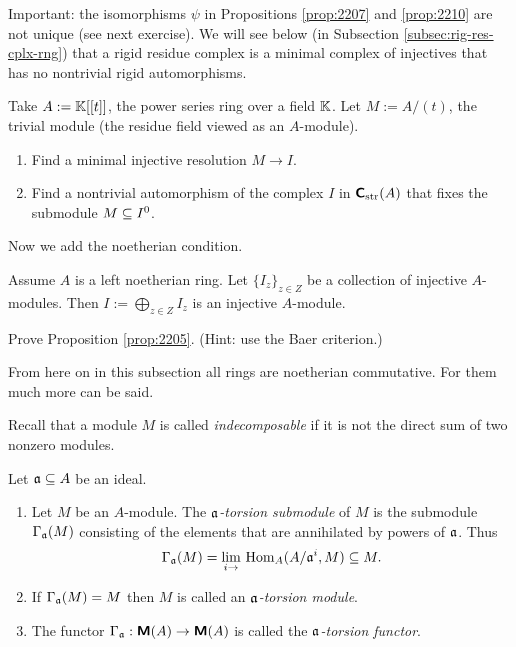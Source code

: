 \begin{rem} \label{rem:2210}
Important: the isomorphisms $\psi$ in Propositions \ref{prop:2207} and 
\ref{prop:2210} are not unique (see next exercise). We will see below (in 
Subsection \ref{subsec:rig-res-cplx-rng}) 
that a rigid residue complex is a minimal complex of injectives that has no 
nontrivial rigid automorphisms. 
\end{rem}

\begin{exer} \label{exer:2210}
Take $A := \mathbb{K}[[t]]$, the power series ring over a field $\mathbb{K}$. 
Let $M := A / (t)$, the trivial module (the residue field viewed as an 
$A$-module). 
\begin{enumerate}
\item Find a minimal injective resolution $M \to  I$. 

\item Find a nontrivial automorphism of the complex $I$ in 
$\boldsymbol{\mathsf{C}}_{\mathrm{str}}(A)$ that fixes the submodule $M \subseteq I^0$. 
\end{enumerate}
\end{exer}

Now we add the noetherian condition. 

\begin{prop} \label{prop:2205}
Assume $A$ is a left noetherian ring. 
Let $\{ I_z \}_{z \in Z}$ be a collection of injective $A$-modules. Then 
$I := \bigoplus_{z \in Z} I_z$ is an injective $A$-module. 
\end{prop}

\begin{exer} \label{exer:2205}
Prove Proposition \ref{prop:2205}. (Hint: use the Baer criterion.)
\end{exer}

From here on in this subsection all rings are noetherian commutative. For 
them much more can be said.

Recall that a module $M$ is called {\em indecomposable} if it is not the 
direct sum of two nonzero modules.  

\begin{dfn} \label{dfn:2208}
Let $\mathfrak{a} \subseteq A$ be an ideal.
\begin{enumerate}
\item Let $M$ be an $A$-module. The {\em 
$\mathfrak{a}$-torsion submodule} of $M$ is the submodule $\Gamma_{\mathfrak{a}}(M)$ 
consisting of the elements that are annihilated by powers of $\mathfrak{a}$. Thus 
\[ \Gamma_{\mathfrak{a}}(M) = \lim_{i \to} \, \operatorname{Hom}_A(A / \mathfrak{a}^i, M) \subseteq M . \]

\item If $\Gamma_{\mathfrak{a}}(M) = M$ then $M$ is called an {\em $\mathfrak{a}$-torsion module}. 

\item The functor 
$\Gamma_{\mathfrak{a}} : \boldsymbol{\mathsf{M}}(A) \to \boldsymbol{\mathsf{M}}(A)$
is called the {\em $\mathfrak{a}$-torsion functor}. 
\end{enumerate}
\end{dfn}

